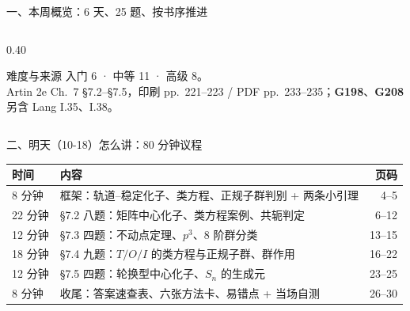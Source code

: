 \documentclass[aspectratio=169,10pt,fontset=none]{ctexbeamer}
\newcommand{\ex}[1]{\textcolor{accent}{\footnotesize\bfseries #1}}
\begin{document}
\begin{frame}[t]{一、本周概览：6 天、25 题、按书序推进}
\begin{columns}[T,onlytextwidth]
\begin{column}{0.40\textwidth}
      \vspace{0.3em}
      \begin{block}{\footnotesize 难度与来源}
        \scriptsize
        入门 6 · 中等 11 · 高级 8。\\[1pt]
        Artin 2e Ch.~7 \S7.2--\S7.5，印刷 pp.~221--223 / PDF pp.~233--235；\ex{G198}、\ex{G208} 另含 Lang I.35、I.38。
      \end{block}
    \end{column}
  \end{columns}
\end{frame}

\begin{frame}[t]{二、明天（10-18）怎么讲：80 分钟议程}
  \centering
  \footnotesize
  \renewcommand{\arraystretch}{1.22}
  \begin{tabular}{@{}l l r@{}}
    \toprule
    时间 & 内容 & 页码\\
    \midrule
    8 分钟  & 框架：轨道--稳定化子、类方程、正规子群判别 + 两条小引理 & 4--5\\
    22 分钟 & \S7.2 八题：矩阵中心化子、类方程案例、共轭判定 & 6--12\\
    12 分钟 & \S7.3 四题：不动点定理、$p^3$、8 阶群分类 & 13--15\\
    18 分钟 & \S7.4 九题：$T/O/I$ 的类方程与正规子群、群作用 & 16--22\\
    12 分钟 & \S7.5 四题：轮换型中心化子、$S_n$ 的生成元 & 23--25\\
    8 分钟  & 收尾：答案速查表、六张方法卡、易错点 + 当场自测 & 26--30\\
    \bottomrule
  \end{tabular}


\end{frame}
\end{document}
